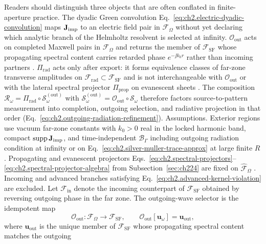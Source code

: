 Readers should distinguish three objects that are often conflated in finite-aperture practice.
The dyadic Green convolution Eq.~\eqref{eq:ch2.electric-dyadic-convolution} maps $\mathbf{J}_{\mathrm{imp}}$ to an electric field
pair in $\mathcal{F}_\Omega$ without yet declaring which analytic branch of the Helmholtz resolvent is selected at infinity.
$\mathcal{O}_{\mathrm{out}}$ acts on completed Maxwell pairs in $\mathcal{F}_\Omega$ and returns the member of
$\mathcal{F}_{\mathrm{SF}}$ whose propagating spectral content carries retarded phase $e^{-\jj k_0 r}$ rather than incoming
partners \cite{sommerfeld1949}.
$\Pi_{\mathrm{rad}}$ acts only after export: it forms equivalence classes of far-zone transverse amplitudes on
$\mathcal{F}_{\mathrm{rad}}\subset\mathcal{F}_{\mathrm{SF}}$ and is not interchangeable with $\mathcal{O}_{\mathrm{out}}$ or with the
lateral spectral projector $\Pi_{\mathrm{prop}}$ on evanescent sheets \cite{harrington2001}.
The composition $\mathcal{R}_\omega=\Pi_{\mathrm{rad}}\circ\mathcal{S}_\omega^{\mathrm{(out)}}$ with
$\mathcal{S}_\omega^{\mathrm{(out)}}=\mathcal{O}_{\mathrm{out}}\circ\mathcal{S}_\omega$ therefore factors source-to-pattern
measurement into completion, outgoing selection, and radiative projection in that order
(Eq.~\eqref{eq:ch2.outgoing-radiation-refinement}).
Assumptions. Exterior regions use vacuum far-zone constants with \(k_0>0\) real in the locked
harmonic band, compact \(\operatorname{supp}\mathbf{J}_{\mathrm{imp}}\), and time-independent
\(\mathcal{B}_\Gamma\) including outgoing radiation condition at infinity or on
Eq.~\eqref{eq:ch2.silver-muller-trace-approx} at large finite \(R\)
\cite{stratton1941}. Propagating and evanescent projectors
Eqs.~\eqref{eq:ch2.spectral-projectors}--\eqref{eq:ch2.spectral-projector-algebra}
from Subsection~\ref{sec:ch224} are fixed on \(\widehat{\mathcal{F}}_\Omega\)
\cite{harrington2001}. Incoming and advanced branches satisfying
Eq.~\eqref{eq:ch2.advanced-kernel-violation} are excluded.
Let \(\mathcal{F}_{\mathrm{in}}\) denote the incoming counterpart of
\(\mathcal{F}_{\mathrm{SF}}\) obtained by reversing outgoing phase in the far zone.
The outgoing-wave selector is the idempotent map
\begin{equation}
\label{eq:ch2.outgoing-selector-def}
\mathcal{O}_{\mathrm{out}}:\mathcal{F}_\Omega\to\mathcal{F}_{\mathrm{SF}},
\qquad
\mathcal{O}_{\mathrm{out}}[\mathbf{u}_\omega]
=
\mathbf{u}_{\mathrm{out}},
\end{equation}
where \(\mathbf{u}_{\mathrm{out}}\) is the unique member of
\(\mathcal{F}_{\mathrm{SF}}\) whose propagating spectral content matches the outgoing
